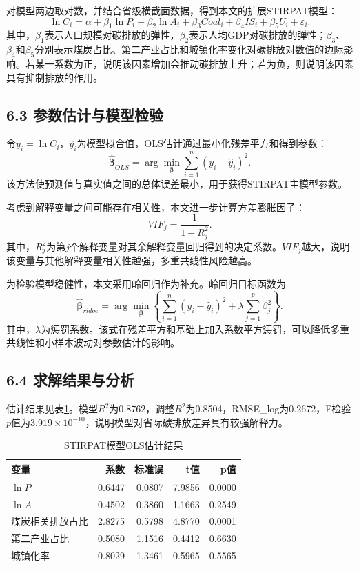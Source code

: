 \documentclass[UTF8,zihao=-4,fontset=windows]{ctexart}
\begin{document}
对模型两边取对数，并结合省级横截面数据，得到本文的扩展STIRPAT模型：
\[
\ln C_i=\alpha+\beta_1\ln P_i+\beta_2\ln A_i+\beta_3Coal_i+\beta_4IS_i+\beta_5U_i+\varepsilon_i.
\]
其中，$\beta_1$表示人口规模对碳排放的弹性，$\beta_2$表示人均GDP对碳排放的弹性；$\beta_3$、$\beta_4$和$\beta_5$分别表示煤炭占比、第二产业占比和城镇化率变化对碳排放对数值的边际影响。若某一系数为正，说明该因素增加会推动碳排放上升；若为负，则说明该因素具有抑制排放的作用。

\subsection*{6.3 参数估计与模型检验}

令$y_i=\ln C_i$，$\hat{y}_i$为模型拟合值，OLS估计通过最小化残差平方和得到参数：
\[
\hat{\boldsymbol\beta}_{OLS}=\arg\min_{\boldsymbol\beta}\sum_{i=1}^{n}(y_i-\hat{y}_i)^2.
\]
该方法使预测值与真实值之间的总体误差最小，用于获得STIRPAT主模型参数。

考虑到解释变量之间可能存在相关性，本文进一步计算方差膨胀因子：
\[
VIF_j=\frac{1}{1-R_j^2}.
\]
其中，$R_j^2$为第$j$个解释变量对其余解释变量回归得到的决定系数。$VIF_j$越大，说明该变量与其他解释变量相关性越强，多重共线性风险越高。

为检验模型稳健性，本文采用岭回归作为补充。岭回归目标函数为
\[
\hat{\boldsymbol\beta}_{ridge}
=\arg\min_{\boldsymbol\beta}\left\{\sum_{i=1}^{n}(y_i-\hat{y}_i)^2+\lambda\sum_{j=1}^{p}\beta_j^2\right\}.
\]
其中，$\lambda$为惩罚系数。该式在残差平方和基础上加入系数平方惩罚，可以降低多重共线性和小样本波动对参数估计的影响。

\subsection*{6.4 求解结果与分析}

估计结果见表\ref{tab:ols}。模型$R^2$为0.8762，调整$R^2$为0.8504，RMSE\_log为0.2672，F检验$p$值为$3.919\times10^{-10}$，说明模型对省际碳排放差异具有较强解释力。

\begin{table}[H]
\centering
\caption{STIRPAT模型OLS估计结果}
\label{tab:ols}
\begin{tabular}{lrrrr}
\toprule
变量 & 系数 & 标准误 & t值 & p值 \\
\midrule
$\ln P$ & 0.6447 & 0.0807 & 7.9856 & 0.0000 \\
$\ln A$ & 0.4502 & 0.3860 & 1.1663 & 0.2549 \\
煤炭相关排放占比 & 2.8275 & 0.5798 & 4.8770 & 0.0001 \\
第二产业占比 & 0.5080 & 1.1516 & 0.4412 & 0.6630 \\
城镇化率 & 0.8029 & 1.3461 & 0.5965 & 0.5565 \\
\bottomrule
\end{tabular}
\end{table}
\end{document}
